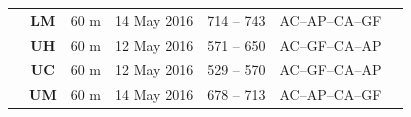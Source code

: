 \documentclass[12pt]{article}
\begin{document}
\begin{landscape}
\begin{table}[]
\begin{tabular}{ccccccl}
                                                                             & \textbf{LM}                                                  & 60 m                                                                     & 14 May 2016   & 714 -- 743                                                                 & AC--AP--CA--GF                                                     &                                                                                                                                                                                                                                                  \\
                                                                             & \textbf{UH}                                                  & 60 m                                                                     & 12 May 2016   & 571 -- 650                                                                 & AC--GF--CA--AP                                                     &                                                                                                                                                                                                                                                  \\
                                                                             & \textbf{UC}                                                  & 60 m                                                                     & 12 May 2016   & 529 -- 570                                                                 & AC--GF--CA--AP                                                     &                                                                                                                                                                                                                                                  \\
                                                                             & \textbf{UM}                                                  & 60 m                                                                     & 14 May 2016   & 678 -- 713                                                                 & AC--AP--CA--GF                                                     &                                                                                                                                                                                                                                                  \\

\end{tabular}
\end{table}
\end{landscape}
\end{document}
